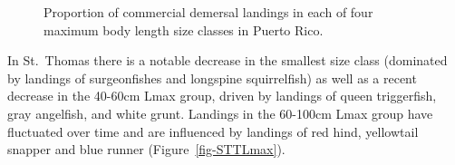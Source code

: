 \documentclass[
  letterpaper,
  oneside,
  open=any]{scrbook}
\begin{document}
\begin{figure}


\caption{\label{fig-PRLmax}Proportion of commercial demersal landings in
each of four maximum body length size classes in Puerto Rico.}

\end{figure}%

In St.~Thomas there is a notable decrease in the smallest size class
(dominated by landings of surgeonfishes and longspine squirrelfish) as
well as a recent decrease in the 40-60cm Lmax group, driven by landings
of queen triggerfish, gray angelfish, and white grunt. Landings in the
60-100cm Lmax group have fluctuated over time and are influenced by
landings of red hind, yellowtail snapper and blue runner
(Figure~\ref{fig-STTLmax}).
\end{document}

